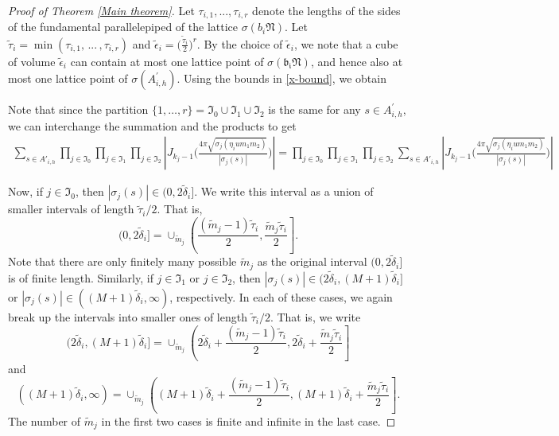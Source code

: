 \documentclass[reqno]{amsart}
\theoremstyle{plain}
\theoremstyle{definition}
\theoremstyle{remark}
\begin{document}
\begin{proof}[Proof of Theorem \ref{Main theorem}]
 
 Let $\tau_{i,1},...,\tau_{i,r}$ denote the lengths of the sides of the fundamental parallelepiped of the lattice $\sigma(b_i\mathfrak{N})$. Let $\tilde\tau_i=\min (\tau_{i,1},\,...\,,\tau_{i,r}) $ and $\tilde{\epsilon}_i=\Big(\frac{\tilde \tau_i}{2}\Big)^r.$ By the choice of $\tilde{\epsilon}_i$, we note that a cube of volume $\tilde{\epsilon}_i$ can contain at most one lattice point of $\sigma( \mathfrak{b_i} \mathfrak{N})$, and hence also at most one lattice point of $\sigma (A^\prime_{i,h})$.  
Using the bounds in \ref{x-bound}, we obtain

Note that since the partition $\{1, \dots, r\} = \mathfrak{I}_0 \cup \mathfrak{I}_1 \cup \mathfrak{I}_2 $ is the same for any $s \in A^\prime_{i,h}$, we can interchange the summation and the products to get
\begin{align*}
\sum_{s\in A'_{i,h} }    \prod_{j\in \mathfrak{I}_0} \prod_{j\in \mathfrak{I}_1} \prod_{j\in \mathfrak{I}_2} \left| J_{k_j-1} \Big(  \frac{4 \pi\sqrt{\sigma_j (\eta_i u m_1m_2 )}}{|\sigma_j(s)|}\Big)\right| =  \prod_{j\in \mathfrak{I}_0} \prod_{j\in \mathfrak{I}_1} \prod_{j\in \mathfrak{I}_2} \sum_{s\in A'_{i,h} }  \left| J_{k_j-1} \Big(  \frac{4 \pi\sqrt{\sigma_j (\eta_i u m_1m_2 )}}{|\sigma_j(s)|}\Big)\right|
\end{align*}

Now, if $j \in \mathfrak{I}_0$, then $|\sigma_j(s)| \in  (0, 2 \tilde{\delta}_i]$. We write this interval as a union of smaller intervals of length $\tilde \tau_i/2$. That is, 
$$
(0, 2 \tilde{\delta}_i] = \cup_{\tilde m_j} \left( \frac{(\tilde m_j - 1) \tilde \tau_i}{2}, \frac{\tilde m_j \tilde \tau_i}{2} \right]. 
$$ 
Note that there are only finitely many possible $\tilde m_j$ as the original interval $(0, 2 \tilde{\delta}_i]$ is of finite length. Similarly, if $j \in \mathfrak{I}_1$ or $j \in \mathfrak{I}_2$, then $|\sigma_j(s)| \in  ( 2 \tilde{\delta}_i, (M+1) \tilde{\delta}_i]$ or $|\sigma_j(s)| \in  ( (M+1) \tilde{\delta}_i, \infty)$, respectively. In each of these cases, we again break up the intervals into smaller ones of length $\tilde \tau_i/2$. That is, we write  
$$
( 2 \tilde{\delta}_i, (M+1) \tilde{\delta}_i] = \cup_{\tilde m_j} \left( 2 \tilde{\delta}_i + \frac{(\tilde m_j - 1) \tilde \tau_i}{2}, 2 \tilde{\delta}_i + \frac{\tilde m_j \tilde \tau_i}{2} \right]
$$
and
$$
( (M+1) \tilde{\delta}_i, \infty) = \cup_{\tilde m_j} \left( (M+1) \tilde{\delta}_i + \frac{(\tilde m_j - 1) \tilde \tau_i}{2}, (M+1) \tilde{\delta}_i + \frac{\tilde m_j \tilde \tau_i}{2} \right].
$$
The number of $\tilde{m}_j$ in the first two cases is finite and infinite in the last case. 


\end{proof}
\end{document}
